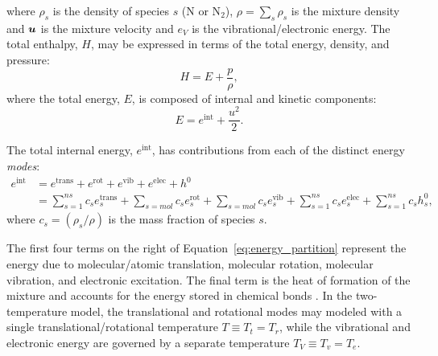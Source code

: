 \documentclass[10pt]{article}
\newcommand{\bv}[1]{\ensuremath{\mbox{\boldmath$ #1 $}}}
\newcommand{\elec}{\text{elec}}
\begin{document}
%
%
where $\rho_s$ is the density of species $s$ (N or N$_2$), $\rho=\sum_s \rho_s$ is the mixture density and  $ \bv{u} $ is the mixture velocity and $e_V$ is  the vibrational/electronic energy. 
%
The total enthalpy, $H$, may be expressed in terms of the total energy, density, and pressure:
$$H = E + \dfrac{p}{\rho},$$
where the total energy, $E$, is composed of internal and kinetic components: $$E = e^{\text{int}} + \dfrac{ u^2 }{2}.$$ 


The total internal energy, $e^{\text{int}}$, has contributions from each of the distinct energy \emph{modes}:%
\begin{equation}
 \begin{split}
e^{\text{int}} &= e^{\text{trans}} + e^{\text{rot}} + e^{\text{vib}} + e^{\elec} + h^0 \\
 &= \sum_{s=1}^{ns} c_s e^{\text{trans}}_s + \sum_{s=mol} c_s e^{\text{rot}}_s + \sum_{s=mol} c_s e^{\text{vib}}_s + \sum_{s=1}^{ns} c_s e^{\elec}_s + \sum_{s=1}^{ns} c_s h^0_s ,
\label{eq:energy_partition}  
 \end{split}
\end{equation}
where $c_s=\left(\rho_s/\rho\right)$ is the mass fraction of species $s$.

The first four terms on the right of Equation~\eqref{eq:energy_partition} represent the energy due to molecular/atomic translation, molecular rotation, molecular vibration, and electronic excitation. The final term is the heat of formation of the mixture and accounts for the energy stored in chemical bonds \citep{Ait1996,Kirk2009}. In the two-temperature model, the translational and rotational modes may modeled with a single translational/rotational temperature $T\equiv T_t = T_r$, while the vibrational and electronic energy are governed by a separate temperature $T_V \equiv T_v=T_e$. 
 
\end{document}
